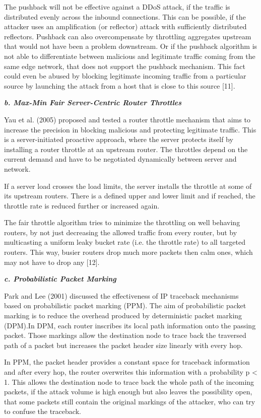 The pushback will not be effective against a DDoS attack, if the traffic is distributed evenly across the inbound connections. This can be possible, if the attacker uses an amplification (or reflector) attack with sufficiently distributed reflectors. Pushback can also overcompensate by throttling aggregates upstream that would not have been a problem downstream. Or if the pushback algorithm is not able to differentiate between malicious and legitimate traffic coming from the same edge network, that does not support the pushback mechanism. This fact could even be abused by blocking legitimate incoming traffic from a particular source by launching the attack from a host that is close to this source [11].

\textbf{\textit{b. Max-Min Fair Server-Centric Router Throttles}}

Yau et al. (2005) proposed and tested a router throttle mechanism that aims to increase the precision in blocking malicious and protecting legitimate traffic. This is a server-initiated proactive approach, where the server protects itself by installing a router throttle at an upstream router. The throttles depend on the current demand and have to be negotiated dynamically between server and network.

If a server load crosses the load limits, the server installs the throttle at some of its upstream routers. There is a defined upper and lower limit and if reached, the throttle rate is reduced further or increased again.

The fair throttle algorithm tries to minimize the throttling on well behaving routers, by not just decreasing the allowed traffic from every router, but by multicasting a uniform leaky bucket rate (i.e. the throttle rate) to all targeted routers. This way, busier routers drop much more packets then calm ones, which may not have to drop any [12].

\textbf{\textit{c. Probabilistic Packet Marking}}

Park and Lee (2001) discussed the effectiveness of IP traceback mechanisms based on probabilistic packet marking (PPM). The aim of probabilistic packet marking is to reduce the overhead produced by deterministic packet marking (DPM).In DPM, each router inscribes its local path information onto the passing packet. Those markings allow the destination node to trace back the traversed path of a packet but increases the packet header size linearly with every hop.

In PPM, the packet header provides a constant space for traceback information and after every hop, the router overwrites this information with a probability p < 1. This allows the destination node to trace back the whole path of the incoming packets, if the attack volume is high enough but also leaves the possibility open, that some packets still contain the original markings of the attacker, who can try to confuse the traceback.

